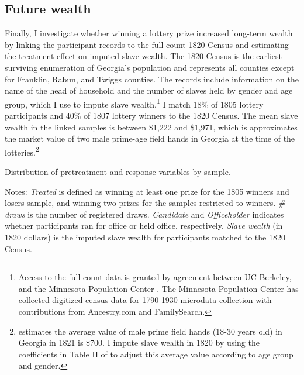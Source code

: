 \subsection{Future wealth}

Finally, I investigate whether winning a lottery prize increased long-term wealth by linking the participant records to the full-count 1820 Census and estimating the treatment effect on imputed slave wealth. The 1820 Census is the earliest surviving enumeration of Georgia's population and represents all counties except for Franklin, Rabun, and Twiggs counties. The records include information on the name of the head of household and the number of slaves held by gender and age group, which I use to impute slave wealth.\footnote{Access to the full-count data is granted by agreement between UC Berkeley, and the Minnesota Population Center \citep{ruggles2015}. The Minnesota Population Center has collected digitized census data for 1790-1930 microdata collection with contributions from Ancestry.com and FamilySearch.} I match 18\% of 1805 lottery participants and 40\% of 1807 lottery winners to the 1820 Census. The mean slave wealth in the linked samples is between \$1,222 and \$1,971, which is approximates the market value of two male prime-age field hands in Georgia at the time of the lotteries.\footnote{ \citet{phillips1905} estimates the average value of male prime field hands (18-30 years old) in Georgia in 1821 is \$700. I impute slave wealth in 1820 by using the coefficients in Table II of \citet{kotlikoff1979} to adjust this average value according to age group and gender.}

\begin{table}[htbp] 
	\begin{center}
		\caption{Distribution of pretreatment and response variables by sample.\label{summary-table}}   
		\resizebox{0.9\width}{!}{}
	\end{center}
	\footnotesize{Notes: \textit{Treated } is defined as winning at least one prize for the 1805 winners and losers sample, and winning two prizes for the samples restricted to winners. \textit{\# draws} is the number of registered draws. \textit{Candidate} and \textit{Officeholder} indicates whether participants ran for office or held office, respectively. \textit{Slave wealth} (in 1820 dollars) is the imputed slave wealth for participants matched to the 1820 Census.} 
\end{table}

